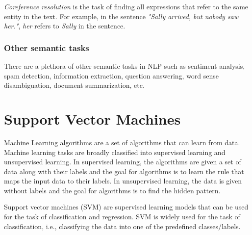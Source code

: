 \textit{Coreference resolution} is the task of finding all expressions that refer to the same entity in the text. For example, in the sentence \textit{"Sally arrived, but nobody saw her."}, \textit{her} refers to \textit{Sally} in the sentence.

\subsubsection{Other semantic tasks}

There are a plethora of other semantic tasks in NLP such as sentiment analysis, spam detection, information extraction, question answering, word sense disambiguation, document summarization, etc.



\section{Support Vector Machines}\label{sec:SVM}

Machine Learning algorithms are a set of algorithms that can learn from data. Machine learning tasks are broadly classified into supervised learning and unsupervised learning. In supervised learning, the algorithms are given a set of data along with their labels and the goal for algorithms is to learn the rule that maps the input data to their labels. In unsupervised learning, the data is given without labels and the goal for algorithms is to find the hidden pattern.

Support vector machines (SVM) are supervised learning models that can be used for the task of classification and regression. SVM is widely used for the task of classification, i.e., classifying the data into one of the predefined classes/labels.

